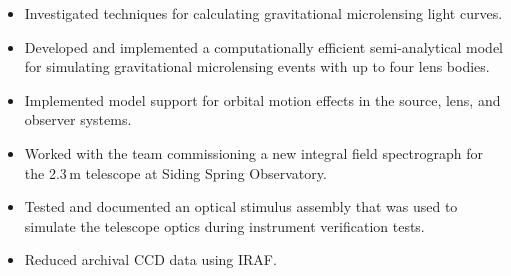 \documentclass[print]{cv-style}
\begin{document}
\begin{entrylist}
  {
\begin{itemize}
    \item Investigated techniques for calculating gravitational microlensing light curves.
    \item Developed and implemented a computationally efficient semi-analytical model for simulating gravitational microlensing events with up to four lens bodies.
    \item Implemented model support for orbital motion effects in the source, lens, and observer systems.
  \end{itemize}}
  {
\begin{itemize}
    \item Worked with the team commissioning a new integral field spectrograph for the 2.3\,m telescope at Siding Spring Observatory.
    \item Tested and documented an optical stimulus assembly that was used to simulate the telescope optics during instrument verification tests.
    \item Reduced archival CCD data using IRAF.
  \end{itemize}}
\end{entrylist}
\end{document}
